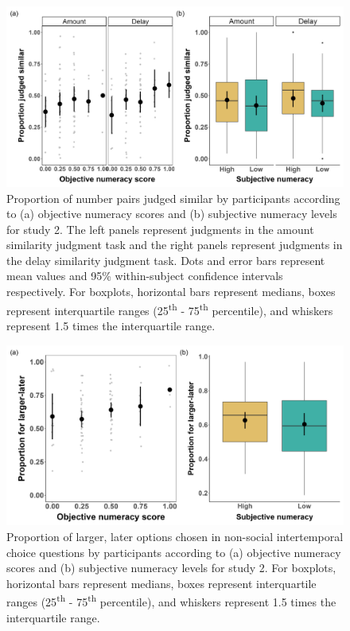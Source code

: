 \documentclass[
  doc,floatsintext]{apa6}
\begin{document}
\begin{figure}
\includegraphics[width=1\linewidth]{figures/numeracy_judgments_2} \caption{Proportion of number pairs judged similar by participants according to (a) objective numeracy scores and (b) subjective numeracy levels for study 2. The left panels represent judgments in the amount similarity judgment task and the right panels represent judgments in the delay similarity judgment task. Dots and error bars represent mean values and 95\% within-subject confidence intervals respectively. For boxplots, horizontal bars represent medians, boxes represent interquartile ranges (25\textsuperscript{th} - 75\textsuperscript{th} percentile), and whiskers represent 1.5 times the interquartile range.}\label{fig:numeracyjudgments2}
\end{figure}



\begin{figure}
\includegraphics[width=1\linewidth]{figures/numeracy_itc_2} \caption{Proportion of larger, later options chosen in non-social intertemporal choice questions by participants according to (a) objective numeracy scores and (b) subjective numeracy levels for study 2. For boxplots, horizontal bars represent medians, boxes represent interquartile ranges (25\textsuperscript{th} - 75\textsuperscript{th} percentile), and whiskers represent 1.5 times the interquartile range.}\label{fig:numeracyitc2}
\end{figure}
\end{document}
